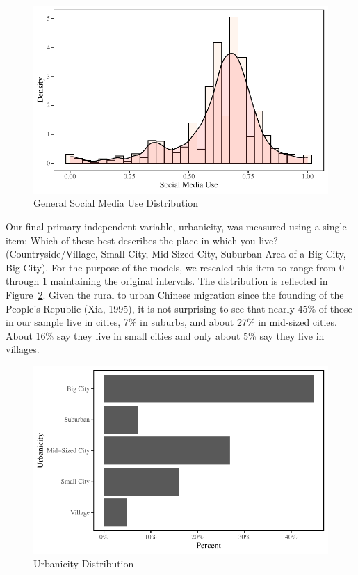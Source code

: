\documentclass[
  letterpaper,
  DIV=11,
  numbers=noendperiod]{scrartcl}
\begin{document}
\begin{figure}

{\centering \includegraphics{Social-Isolation-in-China_files/figure-pdf/fig-sm-use-dist-1.pdf}

}

\caption{\label{fig-sm-use-dist}General Social Media Use Distribution}

\end{figure}

Our final primary independent variable, urbanicity, was measured using a
single item: Which of these best describes the place in which you live?
(Countryside/Village, Small City, Mid-Sized City, Suburban Area of a Big
City, Big City). For the purpose of the models, we rescaled this item to
range from 0 through 1 maintaining the original intervals. The
distribution is reflected in Figure~\ref{fig-urban-dist}. Given the
rural to urban Chinese migration since the founding of the People's
Republic (Xia, 1995), it is not surprising to see that nearly 45\% of
those in our sample live in cities, 7\% in suburbs, and about 27\% in
mid-sized cities. About 16\% say they live in small cities and only
about 5\% say they live in villages.

\begin{figure}

{\centering \includegraphics{Social-Isolation-in-China_files/figure-pdf/fig-urban-dist-1.pdf}

}

\caption{\label{fig-urban-dist}Urbanicity Distribution}

\end{figure}
\end{document}
